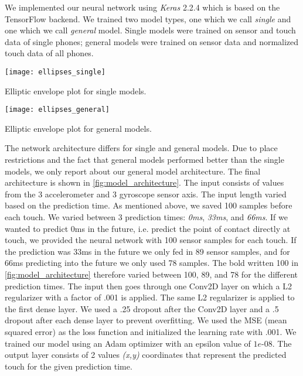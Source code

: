 We implemented our neural network using \textit{Keras} 2.2.4 which is based on the TensorFlow backend.
We trained two model types, one which we call \textit{single} and one which we call \textit{general} model.
Single models were trained on sensor and touch data of single phones; general models were trained on sensor data and normalized touch data of all phones.
\begin{marginfigure}	
	\centering
	\texttt{[image: ellipses\_single]}
	\caption{Elliptic envelope plot for single models.\newline}
	\label{fig:ell_single}
\end{marginfigure}
\begin{marginfigure}
	\texttt{[image: ellipses\_general]}
	\caption{Elliptic envelope plot for general models.}
	\label{fig:ell_general}
\end{marginfigure}
The network architecture differs for single and general models.
Due to place restrictions and the fact that general models performed better than the single models, we only report about our general model architecture.
The final architecture is shown in \cref{fig:model_architecture}.
The input consists of values from the 3 accelerometer and 3 gyroscope sensor axis.
The input length varied based on the prediction time.
As mentioned above, we saved 100 samples before each touch.
We varied between 3 prediction times: \textit{0ms}, \textit{33ms}, and \textit{66ms}.
If we wanted to predict 0ms in the future, i.e. predict the point of contact directly at touch, we provided the neural network with 100 sensor samples for each touch.
If the prediction was 33ms in the future we only fed in 89 sensor samples, and for 66ms predicting into the future we only used 78 samples.
The bold written 100 in \cref{fig:model_architecture} therefore varied between 100, 89, and 78 for the different prediction times.
The input then goes through one Conv2D layer on which a L2 regularizer with a factor of .001 is applied.
The same L2 regularizer is applied to the first dense layer.
We used a .25 dropout after the Conv2D layer and a .5 dropout after each dense layer to prevent overfitting.
We used the MSE (mean squared error) as the loss function and initialized the learning rate with .001.
We trained our model using an Adam optimizer with an epsilon value of $ 1e$-08.
The output layer consists of 2 values \textit{(x,y)} coordinates that represent the predicted touch for the given prediction time.

